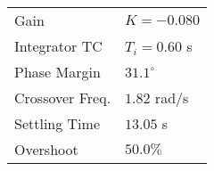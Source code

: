 \begin{tabular}{ll}
Gain & $K = -0.080$ \\
Integrator TC & $T_i = 0.60$ s \\
Phase Margin & $31.1^\circ$ \\
Crossover Freq. & $1.82$ rad/s \\
Settling Time & $13.05$ s \\
Overshoot & $50.0\%$ \\
\end{tabular}
